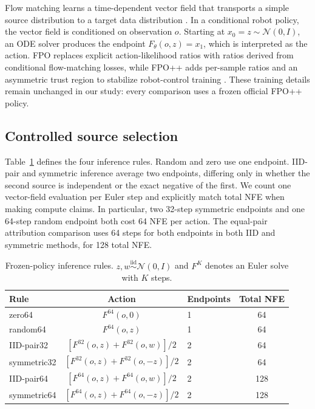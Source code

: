 \documentclass{article}
\begin{document}
Flow matching learns a time-dependent vector field that transports a simple
source distribution to a target data distribution
\citep{lipman2022flowmatching,liu2022rectified}. In a conditional robot policy,
the vector field is conditioned on observation $o$. Starting at
$x_0=z\sim\mathcal{N}(0,I)$, an ODE solver produces the endpoint
$F_\theta(o,z)=x_1$, which is interpreted as the action. FPO replaces explicit
action-likelihood ratios with ratios derived from conditional flow-matching
losses, while FPO++ adds per-sample ratios and an asymmetric trust region to
stabilize robot-control training \citep{mcallister2025flowpolicy,yi2026flowcontrol}.
These training details remain unchanged in our study: every comparison uses a
frozen official FPO++ policy.

\subsection{Controlled source selection}

Table~\ref{tab:rules} defines the four inference rules. Random and zero use one
endpoint. IID-pair and symmetric inference average two endpoints, differing
only in whether the second source is independent or the exact negative of the
first. We count one vector-field evaluation per Euler step and explicitly
match total NFE when making compute claims. In particular, two 32-step
symmetric endpoints and one 64-step random endpoint both cost 64 NFE per
action. The equal-pair attribution comparison uses 64 steps for both endpoints
in both IID and symmetric methods, for 128 total NFE.

\begin{table}[t]
  \caption{Frozen-policy inference rules. $z,w\stackrel{\mathrm{iid}}{\sim}
  \mathcal{N}(0,I)$ and $F^{K}$ denotes an Euler solve with $K$ steps.}
  \label{tab:rules}
  \centering
  \small
  \begin{tabular}{lclc}
    \toprule
    Rule & Action & Endpoints & Total NFE \\
    \midrule
    zero64 & $F^{64}(o,0)$ & 1 & 64 \\
    random64 & $F^{64}(o,z)$ & 1 & 64 \\
    IID-pair32 & $[F^{32}(o,z)+F^{32}(o,w)]/2$ & 2 & 64 \\
    symmetric32 & $[F^{32}(o,z)+F^{32}(o,-z)]/2$ & 2 & 64 \\
    IID-pair64 & $[F^{64}(o,z)+F^{64}(o,w)]/2$ & 2 & 128 \\
    symmetric64 & $[F^{64}(o,z)+F^{64}(o,-z)]/2$ & 2 & 128 \\
    \bottomrule
  \end{tabular}
\end{table}
\end{document}
